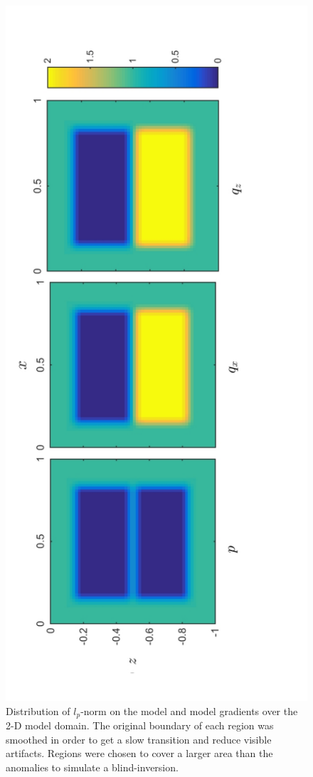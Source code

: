 \begin{figure}[h!]
\centering
\includegraphics[scale=0.55, angle=270]{2D_Mix_lp_norms}
\caption{Distribution of $l_p$-norm on the model and model gradients over the 2-D model domain. The original boundary of each region was smoothed in order to get a slow transition and reduce visible artifacts. Regions were chosen to cover a larger area than the anomalies to simulate  a blind-inversion. }
\label{fig:2D_Mix_lp_norms}
\end{figure}

